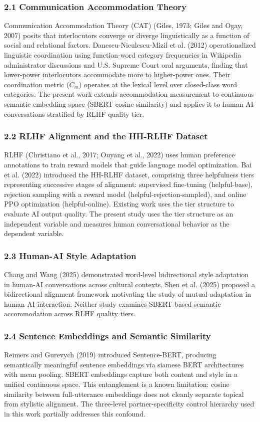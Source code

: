
\subsubsection{2.1 Communication Accommodation Theory}

Communication Accommodation Theory (CAT) (Giles, 1973; Giles and Ogay, 2007) posits that interlocutors converge or diverge linguistically as a function of social and relational factors. Danescu-Niculescu-Mizil et al. (2012) operationalized linguistic coordination using function-word category frequencies in Wikipedia administrator discussions and U.S. Supreme Court oral arguments, finding that lower-power interlocutors accommodate more to higher-power ones. Their coordination metric ($C_m$) operates at the lexical level over closed-class word categories. The present work extends accommodation measurement to continuous semantic embedding space (SBERT cosine similarity) and applies it to human-AI conversations stratified by RLHF quality tier.

\subsubsection{2.2 RLHF Alignment and the HH-RLHF Dataset}

RLHF (Christiano et al., 2017; Ouyang et al., 2022) uses human preference annotations to train reward models that guide language model optimization. Bai et al. (2022) introduced the HH-RLHF dataset, comprising three helpfulness tiers representing successive stages of alignment: supervised fine-tuning (helpful-base), rejection sampling with a reward model (helpful-rejection-sampled), and online PPO optimization (helpful-online). Existing work uses the tier structure to evaluate AI output quality. The present study uses the tier structure as an independent variable and measures human conversational behavior as the dependent variable.

\subsubsection{2.3 Human-AI Style Adaptation}

Chang and Wang (2025) demonstrated word-level bidirectional style adaptation in human-AI conversations across cultural contexts. Shen et al. (2025) proposed a bidirectional alignment framework motivating the study of mutual adaptation in human-AI interaction. Neither study examines SBERT-based semantic accommodation across RLHF quality tiers.

\subsubsection{2.4 Sentence Embeddings and Semantic Similarity}

Reimers and Gurevych (2019) introduced Sentence-BERT, producing semantically meaningful sentence embeddings via siamese BERT architectures with mean pooling. SBERT embeddings capture both content and style in a unified continuous space. This entanglement is a known limitation: cosine similarity between full-utterance embeddings does not cleanly separate topical from stylistic alignment. The three-level partner-specificity control hierarchy used in this work partially addresses this confound.
